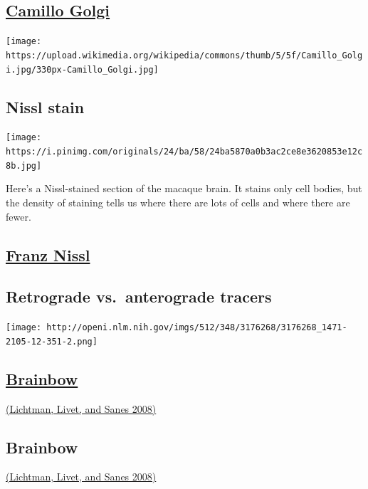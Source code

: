 \documentclass[]{article}
\begin{document}
\subsection{\texorpdfstring{\href{https://en.wikipedia.org/wiki/Camillo_Golgi}{Camillo
Golgi}}{Camillo Golgi}}\label{camillo-golgi}

\texttt{[image: https://upload.wikimedia.org/wikipedia/commons/thumb/5/5f/Camillo\_Golgi.jpg/330px-Camillo\_Golgi.jpg]}

\subsection{Nissl stain}\label{nissl-stain}

\texttt{[image: https://i.pinimg.com/originals/24/ba/58/24ba5870a0b3ac2ce8e3620853e12c8b.jpg]}

Here's a Nissl-stained section of the macaque brain. It stains only cell
bodies, but the density of staining tells us where there are lots of
cells and where there are fewer.

\subsection{\texorpdfstring{\href{https://en.wikipedia.org/wiki/Franz_Nissl}{Franz
Nissl}}{Franz Nissl}}\label{franz-nissl}

\subsection{Retrograde vs.~anterograde
tracers}\label{retrograde-vs.anterograde-tracers}


\texttt{[image: http://openi.nlm.nih.gov/imgs/512/348/3176268/3176268\_1471-2105-12-351-2.png]}

\subsection{\texorpdfstring{\href{http://cbs.fas.harvard.edu/science/connectome-project/brainbow}{Brainbow}}{Brainbow}}\label{brainbow}

\href{http://doi.org/10.1038/nrn2391}{(Lichtman, Livet, and Sanes 2008)}

\subsection{Brainbow}\label{brainbow-1}

\href{http://doi.org/10.1038/nrn2391}{(Lichtman, Livet, and Sanes 2008)}
\end{document}
